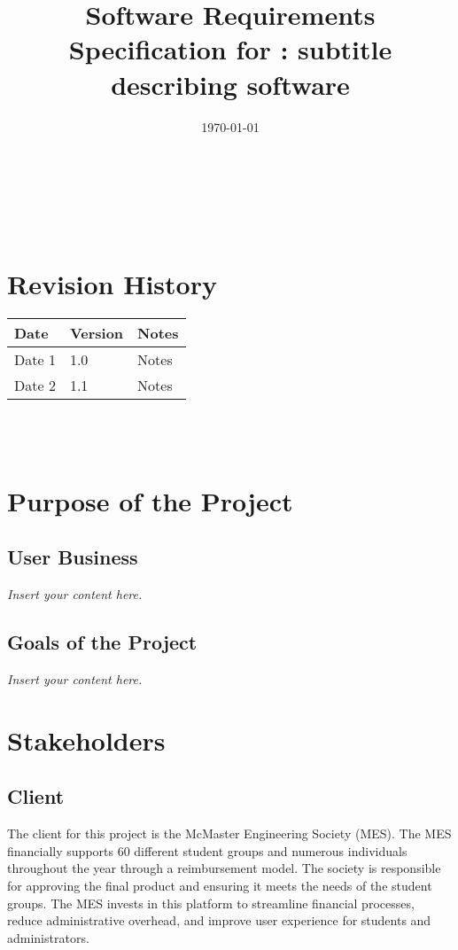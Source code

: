 \documentclass[12pt]{article}
\newcommand{\lips}{\textit{Insert your content here.}}
\begin{document}
\title{Software Requirements Specification for \progname: subtitle describing software} 
\author{\authname}
\date{\today}
	
\maketitle

~\newpage


\tableofcontents

~\newpage

\section*{Revision History}

\begin{tabularx}{\textwidth}{p{3cm}p{2cm}X}
\toprule {\textbf{Date}} & {\textbf{Version}} & {\textbf{Notes}}\\
\midrule
Date 1 & 1.0 & Notes\\
Date 2 & 1.1 & Notes\\
\bottomrule
\end{tabularx}

~\\

~\newpage
\section{Purpose of the Project}
\subsection{User Business}
\lips
\subsection{Goals of the Project}
\lips
\section{Stakeholders} 

\subsection{Client}
The client for this project is the McMaster Engineering Society (MES). The MES financially supports 60 different student groups and numerous individuals throughout the year through a reimbursement model. The society is responsible for approving the final product and ensuring it meets the needs of the student groups.
The MES invests in this platform to streamline financial processes, reduce administrative overhead, and improve user experience for students and administrators.
\end{document}
